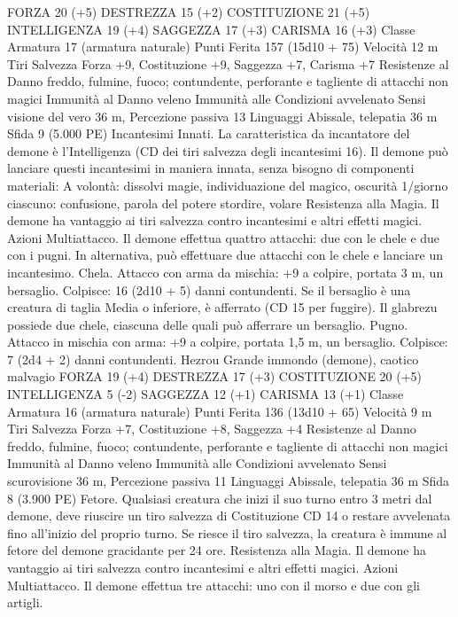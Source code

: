 \begin{multicols}{2}
FORZA 20 (+5)
DESTREZZA 15 (+2)
COSTITUZIONE 21 (+5)
INTELLIGENZA 19 (+4)
SAGGEZZA 17 (+3)
CARISMA 16 (+3)
Classe Armatura 17 (armatura naturale)
Punti Ferita 157 (15d10 + 75)
Velocità 12 m
Tiri Salvezza Forza +9, Costituzione +9, Saggezza +7, Carisma
+7
Resistenze al Danno freddo, fulmine, fuoco; contundente,
perforante e tagliente di attacchi non magici
Immunità al Danno veleno
Immunità alle Condizioni avvelenato
Sensi visione del vero 36 m, Percezione passiva 13
Linguaggi Abissale, telepatia 36 m
Sfida 9 (5.000 PE)
Incantesimi Innati. La caratteristica da incantatore del demone è
l’Intelligenza (CD dei tiri salvezza degli incantesimi 16). Il
demone può lanciare questi incantesimi in maniera innata, senza
bisogno di componenti materiali:
A volontà: dissolvi magie, individuazione del magico, oscurità
1/giorno ciascuno: confusione, parola del potere stordire, volare
Resistenza alla Magia. Il demone ha vantaggio ai tiri salvezza
contro incantesimi e altri effetti magici.
Azioni
Multiattacco. Il demone effettua quattro attacchi: due con le
chele e due con i pugni. In alternativa, può effettuare due attacchi
con le chele e lanciare un incantesimo.
Chela. Attacco con arma da mischia: +9 a colpire, portata 3 m,
un bersaglio.
Colpisce: 16 (2d10 + 5) danni contundenti. Se il bersaglio è una
creatura di taglia Media o inferiore, è afferrato (CD 15 per
fuggire). Il glabrezu possiede due chele, ciascuna delle quali può
afferrare un bersaglio.
Pugno. Attacco in mischia con arma: +9 a colpire, portata 1,5 m,
un bersaglio.
Colpisce: 7 (2d4 + 2) danni contundenti.
Hezrou
Grande immondo (demone), caotico malvagio
FORZA 19 (+4)
DESTREZZA 17 (+3)
COSTITUZIONE 20 (+5)
INTELLIGENZA 5 (-2)
SAGGEZZA 12 (+1)
CARISMA 13 (+1)
Classe Armatura 16 (armatura naturale)
Punti Ferita 136 (13d10 + 65)
Velocità 9 m
Tiri Salvezza Forza +7, Costituzione +8, Saggezza +4
Resistenze al Danno freddo, fulmine, fuoco; contundente,
perforante e tagliente di attacchi non magici
Immunità al Danno veleno
Immunità alle Condizioni avvelenato
Sensi scurovisione 36 m, Percezione passiva 11
Linguaggi Abissale, telepatia 36 m
Sfida 8 (3.900 PE)
Fetore. Qualsiasi creatura che inizi il suo turno entro 3 metri dal
demone, deve riuscire un tiro salvezza di Costituzione CD 14 o
restare avvelenata fino all’inizio del proprio turno. Se riesce il
tiro salvezza, la creatura è immune al fetore del demone
gracidante per 24 ore.
Resistenza alla Magia. Il demone ha vantaggio ai tiri salvezza
contro incantesimi e altri effetti magici.
Azioni
Multiattacco. Il demone effettua tre attacchi: uno con il morso e
due con gli artigli.

\end{multicols}
